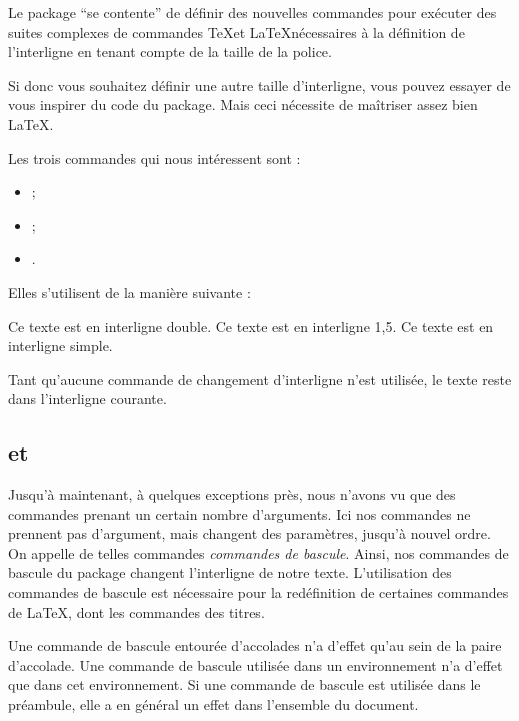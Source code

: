\begin{plusloins}
Le package   \enquote{se contente} de définir des nouvelles commandes pour exécuter des suites complexes de commandes \TeX et \LaTeX nécessaires à la définition de l'interligne en tenant compte de la taille de la police.

Si donc vous souhaitez définir une autre taille d'interligne, vous pouvez essayer de vous inspirer du code du package. Mais ceci nécessite de maîtriser assez bien \LaTeX. 
\end{plusloins}

Les trois commandes qui nous intéressent sont :
\begin{itemize}
\item{} ; 
\item{} ; 
\item{}.
\end{itemize}

 Elles s'utilisent de la manière suivante :

\begin{latexcode}
\doublespacing
Ce texte est en interligne double.
\onehalfspacing
Ce texte est en interligne 1,5.
\singlespacing
Ce texte est en interligne simple. 
\end{latexcode}

Tant qu'aucune commande de changement d'interligne n'est utilisée, le texte reste dans l'interligne courante. 

\subsection{ et }\label{bascule}

Jusqu'à maintenant, à quelques exceptions près, nous n'avons vu que des commandes prenant un certain nombre d'arguments. Ici nos commandes ne prennent pas d'argument, mais changent des paramètres, jusqu'à nouvel ordre. On appelle de telles commandes \emph{commandes de bascule}. Ainsi, nos commandes de bascule du package  changent l'interligne de notre texte. L'utilisation des commandes de bascule est nécessaire pour la redéfinition de certaines commandes de \LaTeX, dont les commandes des titres.

Une commande de bascule entourée d'accolades n'a d'effet qu'au sein de la paire d'accolade. Une commande de bascule utilisée dans un environnement n'a d'effet que dans cet environnement. Si une commande de bascule est utilisée dans le préambule, elle a en général un effet dans l'ensemble du document.\label{porteebascule} 

